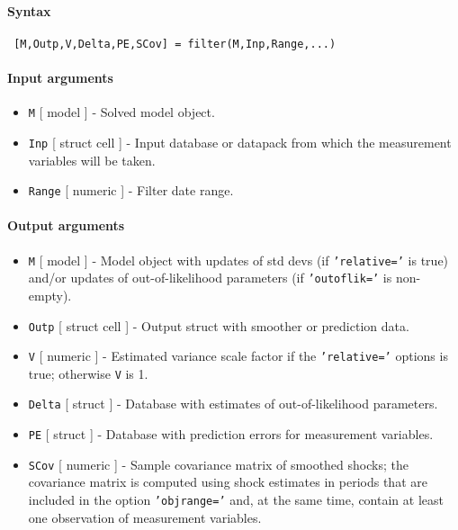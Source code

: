 


	\paragraph{Syntax}
 
 \begin{verbatim}
 [M,Outp,V,Delta,PE,SCov] = filter(M,Inp,Range,...)
 \end{verbatim}
 
 \paragraph{Input arguments}
 
 \begin{itemize}
 \item
   \texttt{M} {[} model {]} - Solved model object.
 \item
   \texttt{Inp} {[} struct \textbar{} cell {]} - Input database or
   datapack from which the measurement variables will be taken.
 \item
   \texttt{Range} {[} numeric {]} - Filter date range.
 \end{itemize}
 
 \paragraph{Output arguments}
 
 \begin{itemize}
 \item
   \texttt{M} {[} model {]} - Model object with updates of std devs (if
   \texttt{'relative='} is true) and/or updates of out-of-likelihood
   parameters (if \texttt{'outoflik='} is non-empty).
 \item
   \texttt{Outp} {[} struct \textbar{} cell {]} - Output struct with
   smoother or prediction data.
 \item
   \texttt{V} {[} numeric {]} - Estimated variance scale factor if the
   \texttt{'relative='} options is true; otherwise \texttt{V} is 1.
 \item
   \texttt{Delta} {[} struct {]} - Database with estimates of
   out-of-likelihood parameters.
 \item
   \texttt{PE} {[} struct {]} - Database with prediction errors for
   measurement variables.
 \item
   \texttt{SCov} {[} numeric {]} - Sample covariance matrix of smoothed
   shocks; the covariance matrix is computed using shock estimates in
   periods that are included in the option \texttt{'objrange='} and, at
   the same time, contain at least one observation of measurement
   variables.
 \end{itemize}
 
